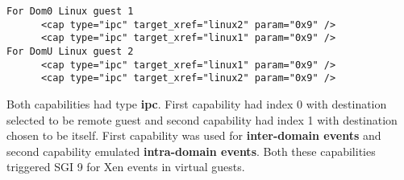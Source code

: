 \begin{lstlisting}[caption=Capabilities added for event notifications in guest configuration on PHIDIAS, label={cap}]
For Dom0 Linux guest 1
      <cap type="ipc" target_xref="linux2" param="0x9" /> 
      <cap type="ipc" target_xref="linux1" param="0x9" /> 
For DomU Linux guest 2
      <cap type="ipc" target_xref="linux1" param="0x9" /> 
      <cap type="ipc" target_xref="linux2" param="0x9" /> 
\end{lstlisting}

Both capabilities had type \textbf{ipc}. First capability had index 0 with destination selected to be remote guest and second capability had index 1 with destination chosen to be itself. First capability was used for \textbf{inter-domain events} and second capability emulated \textbf{intra-domain events}. Both these capabilities triggered SGI 9 for Xen events in virtual guests.

